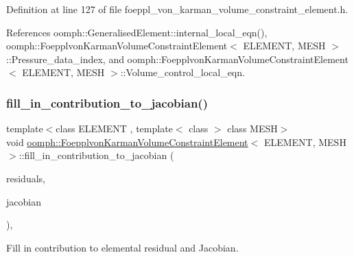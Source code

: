 Definition at line 127 of file foeppl\+\_\+von\+\_\+karman\+\_\+volume\+\_\+constraint\+\_\+element.\+h.



References oomph\+::\+Generalised\+Element\+::internal\+\_\+local\+\_\+eqn(), oomph\+::\+Foepplvon\+Karman\+Volume\+Constraint\+Element$<$ E\+L\+E\+M\+E\+N\+T, M\+E\+S\+H $>$\+::\+Pressure\+\_\+data\+\_\+index, and oomph\+::\+Foepplvon\+Karman\+Volume\+Constraint\+Element$<$ E\+L\+E\+M\+E\+N\+T, M\+E\+S\+H $>$\+::\+Volume\+\_\+control\+\_\+local\+\_\+eqn.

\mbox{\label{classoomph_1_1FoepplvonKarmanVolumeConstraintElement_a3763adc00373350071bef1dea329f94d}} 
\subsubsection{\texorpdfstring{fill\+\_\+in\+\_\+contribution\+\_\+to\+\_\+jacobian()}{fill\_in\_contribution\_to\_jacobian()}}
{\footnotesize\ttfamily template$<$class E\+L\+E\+M\+E\+NT , template$<$ class $>$ class M\+E\+SH$>$ \\
void \hyperlink{classoomph_1_1FoepplvonKarmanVolumeConstraintElement}{oomph\+::\+Foepplvon\+Karman\+Volume\+Constraint\+Element}$<$ E\+L\+E\+M\+E\+NT, M\+E\+SH $>$\+::fill\+\_\+in\+\_\+contribution\+\_\+to\+\_\+jacobian (\begin{DoxyParamCaption}\item[{\hyperlink{classoomph_1_1Vector}{Vector}$<$ double $>$ \&}]{residuals,  }\item[{\hyperlink{classoomph_1_1DenseMatrix}{Dense\+Matrix}$<$ double $>$ \&}]{jacobian }\end{DoxyParamCaption})\hspace{0.3cm}{\ttfamily [inline]}, {\ttfamily [virtual]}}



Fill in contribution to elemental residual and Jacobian. 




